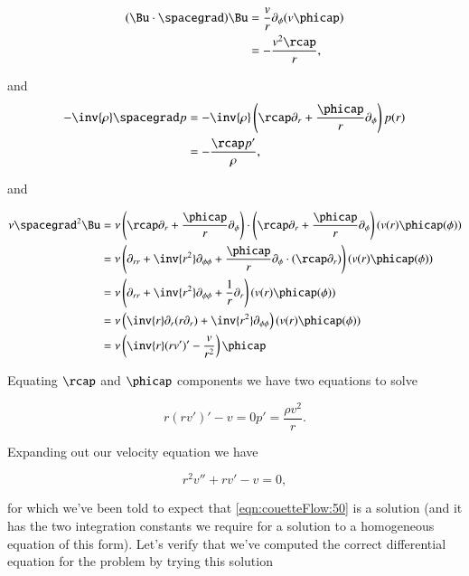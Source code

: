 \begin{align*}
(\Bu \cdot \spacegrad) \Bu
&=
\frac{ v}{r} \partial_\phi  ( v \phicap ) \\
&=
-\frac{ v^2 \rcap}{r},
\end{align*}

and
\begin{align*}
-\inv{\rho} \spacegrad p
&=
-\inv{\rho} \left( \rcap \partial_r + \frac{\phicap}{r} \partial_\phi \right) p(r) \\
&=
-\frac{\rcap p'}{\rho},
\end{align*}

and 

\begin{align*}
\nu \spacegrad^2 \Bu
&=
\nu 
\left( \rcap \partial_r + \frac{\phicap}{r} \partial_\phi \right) \cdot
\left( \rcap \partial_r + \frac{\phicap}{r} \partial_\phi \right) 
(v(r) \phicap(\phi)) \\
&=
\nu 
\left( 
\partial_{rr} + \inv{r^2} \partial_{\phi\phi}
+ 
\frac{\phicap}{r} \partial_\phi \cdot (\rcap \partial_r)
\right)
(v(r) \phicap(\phi)) \\
&=
\nu 
\left( 
\partial_{rr} + \inv{r^2} \partial_{\phi\phi}
+ 
\frac{1}{r} \partial_r
\right)
(v(r) \phicap(\phi)) \\
&=
\nu 
\left( 
\inv{r} \partial_{r} (r \partial_r) + \inv{r^2} \partial_{\phi\phi}
\right)
(v(r) \phicap(\phi)) \\
&=
\nu 
\left( 
\inv{r} (r v')' - \frac{v}{r^2} 
\right)
\phicap
\end{align*}

Equating $\rcap$ and $\phicap$ components we have two equations to solve

\begin{subequations}
\begin{equation}\label{eqn:couetteFlow:130}
r (r v')' - v = 0
\end{equation}
\begin{equation}\label{eqn:couetteFlow:150}
p' = \frac{\rho v^2}{r}.
\end{equation}
\end{subequations}

Expanding out our velocity equation we have

\begin{equation}\label{eqn:couetteFlow:170}
r^2 v'' + r v' - v = 0,
\end{equation}

for which we've been told to expect that \ref{eqn:couetteFlow:50} is a solution (and it has the two integration constants we require for a solution to a homogeneous equation of this form).  Let's verify that we've computed the correct differential equation for the problem by trying this solution

